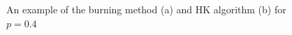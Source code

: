 \documentclass[11pt]{article}
\begin{document}
    \begin{figure}[H]
        \centering
        \caption{An example of the burning method (a) and HK algorithm (b) for $p = 0.4$}
        \label{fig:first}
    \end{figure}
\end{document}

